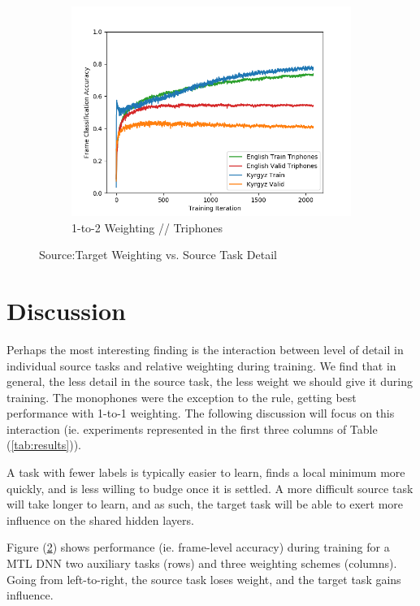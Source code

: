 \documentclass[a4paper]{article}
\begin{document}
\begin{figure}[!htbp]
\begin{subfigure}{.3\textwidth}
  \includegraphics[width=1\textwidth,keepaspectratio]{figs-1/2-to-1-tri.png}
  \caption{1-to-2 Weighting // Triphones}
  \label{fig:sub2}
\end{subfigure}
\caption{Source:Target Weighting vs. Source Task Detail}
\label{fig:1-to-2}
\end{figure}



\section{Discussion}

Perhaps the most interesting finding is the interaction between level of detail in individual source tasks and relative weighting during training. We find that in general, the less detail in the source task, the less weight we should give it during training. The monophones were the exception to the rule, getting best performance with 1-to-1 weighting. The following discussion will focus on this interaction (ie. experiments represented in the first three columns of Table (\ref{tab:results})). 

A task with fewer labels is typically easier to learn, finds a local minimum more quickly, and is less willing to budge once it is settled. A more difficult source task will take longer to learn, and as such, the target task will be able to exert more influence on the shared hidden layers.

Figure (\ref{fig:1-to-2}) shows performance (ie. frame-level accuracy) during training for a MTL DNN two auxiliary tasks (rows) and three weighting schemes (columns). Going from left-to-right, the source task loses weight, and the target task gains influence.
\end{document}
